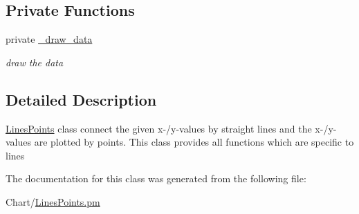 \subsection*{Private Functions}
\label{_amgrp8d29cff216bafa3117e21883ea7c6b5f}
 \begin{DoxyCompactItemize}
\item 
\hypertarget{classChart_1_1LinesPoints_a52414c96effaab4189c8488e2ebae742}{
private \hyperlink{classChart_1_1LinesPoints_a52414c96effaab4189c8488e2ebae742}{\_\-draw\_\-data}}
\label{classChart_1_1LinesPoints_a52414c96effaab4189c8488e2ebae742}

\begin{DoxyCompactList}\small\item\em draw the data \item\end{DoxyCompactList}\end{DoxyCompactItemize}


\subsection{Detailed Description}
\hyperlink{classChart_1_1LinesPoints}{LinesPoints} class connect the given x-\//y-\/values by straight lines and the x-\//y-\/values are plotted by points. This class provides all functions which are specific to lines 

The documentation for this class was generated from the following file:\begin{DoxyCompactItemize}
\item 
Chart/\hyperlink{LinesPoints_8pm}{LinesPoints.pm}\end{DoxyCompactItemize}
